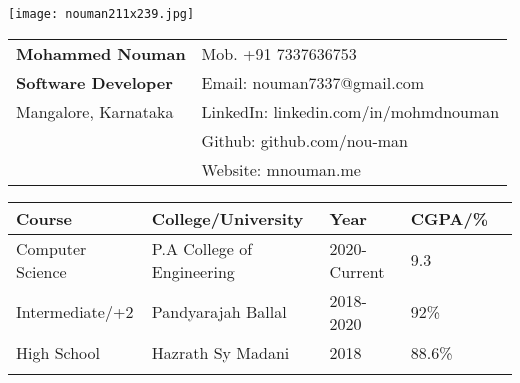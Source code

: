 \documentclass[10pt,article]{article}
\newcommand{\resheading}[1]{{\small \colorbox{mygrey} { \begin{minipage}{0.99\textwidth}\centering{\textbf{#1 \vphantom{p\^{E}}}}\end{minipage}}}}
\begin{document}
\begin{table}
    \begin{minipage}{0\linewidth}
        \centering
        \texttt{[image: nouman211x239.jpg]}
    \end{minipage}
    \begin{minipage}{0.9\linewidth}
        \setlength{\tabcolsep}{70pt}
        \def\arraystretch{1.1}
        \begin{tabular}{ll}
            \textbf{\Large{Mohammed Nouman}}  &  {Mob. +91 7337636753} \\
            \textbf{Software Developer} &    {Email: nouman7337@gmail.com} \\
            {Mangalore, Karnataka}  & {LinkedIn: linkedin.com/in/mohmdnouman}\\
            {} & {Github: github.com/nou-man}\\
            {} & {Website: mnouman.me}
        \end{tabular}
    \end{minipage}\hfill
\end{table}

\setlength{\tabcolsep}{32pt}
\begin{table}
\centering
\begin{tabular}{lllll}
\toprule
\toprule
\textbf{Course}    & \textbf{College/University}     & \textbf{Year}     & \textbf{CGPA/\%} \\ 
\toprule
Computer Science & P.A College of Engineering  & 2020-Current   & 9.3\\ 
Intermediate/+2      & Pandyarajah Ballal & 2018-2020 & 92\%  \\ 
High School      & Hazrath Sy Madani & 2018 & 88.6\%   \\ 
\bottomrule
\bottomrule \\[-0.9cm]
\end{tabular}
\end{table}

\end{document}
